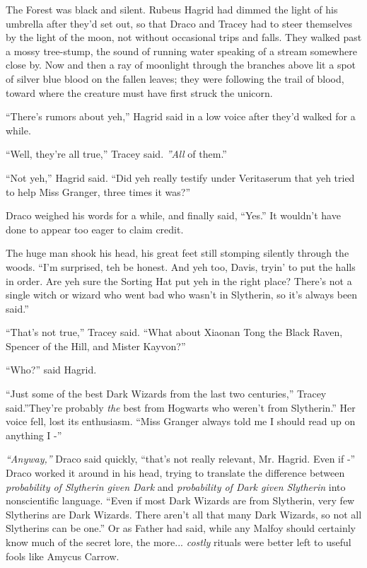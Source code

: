 The Forest was black and silent. Rubeus Hagrid had dimmed the light of
his umbrella after they'd set out, so that Draco and Tracey had to steer
themselves by the light of the moon, not without occasional trips and
falls. They walked past a mossy tree-stump, the sound of running water
speaking of a stream somewhere close by. Now and then a ray of moonlight
through the branches above lit a spot of silver blue blood on the fallen
leaves; they were following the trail of blood, toward where the
creature must have first struck the unicorn.

``There's rumors about yeh,'' Hagrid said in a low voice after they'd
walked for a while.

``Well, they're all true,'' Tracey said. \emph{''All} of them.''

``Not yeh,'' Hagrid said. ``Did yeh really testify under Veritaserum
that yeh tried to help Miss Granger, three times it was?''

Draco weighed his words for a while, and finally said, ``Yes.'' It
wouldn't have done to appear too eager to claim credit.

The huge man shook his head, his great feet still stomping silently
through the woods. ``I'm surprised, teh be honest. And yeh too, Davis,
tryin' to put the halls in order. Are yeh sure the Sorting Hat put yeh
in the right place? There's not a single witch or wizard who went bad
who wasn't in Slytherin, so it's always been said.''

``That's not true,'' Tracey said. ``What about Xiaonan Tong the Black
Raven, Spencer of the Hill, and Mister Kayvon?''

``Who?'' said Hagrid.

``Just some of the best Dark Wizards from the last two centuries,''
Tracey said.''They're probably \emph{the} best from Hogwarts who weren't
from Slytherin.'' Her voice fell, lost its enthusiasm. ``Miss Granger
always told me I should read up on anything I -''

\emph{``Anyway,''} Draco said quickly, ``that's not really relevant, Mr.
Hagrid. Even if -'' Draco worked it around in his head, trying to
translate the difference between \emph{probability of Slytherin given
Dark} and \emph{probability of Dark given Slytherin} into nonscientific
language. ``Even if most Dark Wizards are from Slytherin, very few
Slytherins are Dark Wizards. There aren't all that many Dark Wizards, so
not all Slytherins can be one.'' Or as Father had said, while any Malfoy
should certainly know much of the secret lore, the more...
\emph{costly} rituals were better left to useful fools like Amycus
Carrow.

